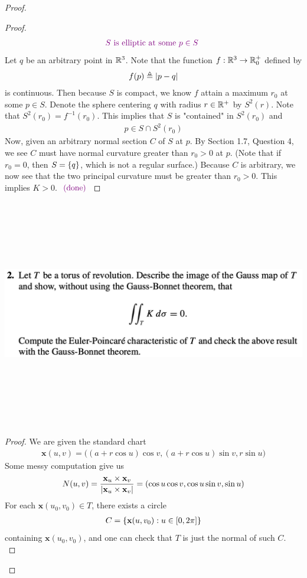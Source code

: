 \documentclass{report}
\begin{document}
\begin{proof}
\begin{proof}
\begin{align*}
\textcolor{violet}{S\text{ is elliptic at some $p\in  S$ }}
\end{align*}
Let $q$ be an arbitrary point in $\mathbb{R}^3$. Note that the function $f:\mathbb{R}^3\rightarrow \mathbb{R}^+_0$ defined by
\begin{align*}
f(p)\triangleq \left|p-q\right|
\end{align*}
is continuous. Then because  $S$ is compact, we know  $f$ attain a maximum $r_0$ at some $p\in S$. Denote the sphere centering $q$ with radius $r\in\mathbb{R}^+$ by $S^2(r)$. Note that $S^2(r_0)=f^{-1}(r_0)$. This implies that $S$ is "contained" in  $S^2(r_0)$ and 
\begin{align*}
p \in S\cap S^2(r_0)
\end{align*}
Now, given an arbitrary normal section $C$ of $S$ at  $p$. By Section 1.7, Question 4, we see $C$ must have normal curvature greater than $r_0>0$ at $p$. (Note that if $r_0=0$, then  $S=\{ q \}$, which is not a regular surface.) Because $C$ is arbitrary, we now see that the two principal curvature must be greater than  $r_0>0$. This implies $K>0$.  $\textcolor{violet}{\text{ (done) }}$





\end{proof}
\begin{question}{}{}
\includegraphics[height=10cm,width=18cm]{hw77}
\end{question}
\begin{proof}
We are given the standard chart 
\begin{align*}
\textbf{x}(u,v)=\Big( (a+r\cos u)\cos v, (a+r\cos u)\sin v, r \sin u \Big)
\end{align*}
Some messy computation give us 
\begin{align*}
N(u,v)= \frac{\textbf{x}_u \times \textbf{x}_v}{\left|\textbf{x}_u\times\textbf{x}_v\right|}=(\cos u \cos v, \cos u \sin v, \sin u)
\end{align*}
For each $\textbf{x}(u_0,v_0) \in T$, there exists a circle 
\begin{align*}
C=\{ \textbf{x}(u,v_0):u \in [0,2\pi] \}
\end{align*}
containing $\textbf{x}(u_0,v_0)$, and one can check that $T$ is just the normal of such $C$.\\


\end{proof}
\end{proof}
\end{document}
